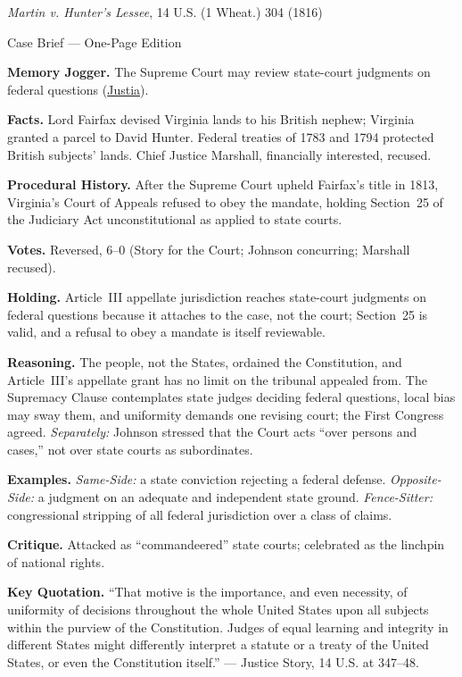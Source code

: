 \documentclass[12pt]{article}
\begin{document}
\begin{center}
{\Large \textit{Martin v. Hunter's Lessee}, 14 U.S. (1 Wheat.) 304 (1816)\par}
\vspace{0.3em}
{\normalsize Case Brief --- One-Page Edition\par}
\end{center}

\textbf{Memory Jogger.} The Supreme Court may review state-court judgments on federal questions (\href{https://supreme.justia.com/cases/federal/us/14/304/}{Justia}).

\textbf{Facts.} Lord Fairfax devised Virginia lands to his British nephew; Virginia granted a parcel to David Hunter. Federal treaties of 1783 and 1794 protected British subjects' lands. Chief Justice Marshall, financially interested, recused.

\textbf{Procedural History.} After the Supreme Court upheld Fairfax's title in 1813, Virginia's Court of Appeals refused to obey the mandate, holding Section~25 of the Judiciary Act unconstitutional as applied to state courts.

\textbf{Votes.} Reversed, 6--0 (Story for the Court; Johnson concurring; Marshall recused).

\textbf{Holding.} Article~III appellate jurisdiction reaches state-court judgments on federal questions because it attaches to the case, not the court; Section~25 is valid, and a refusal to obey a mandate is itself reviewable.

\textbf{Reasoning.} The people, not the States, ordained the Constitution, and Article~III's appellate grant has no limit on the tribunal appealed from. The Supremacy Clause contemplates state judges deciding federal questions, local bias may sway them, and uniformity demands one revising court; the First Congress agreed. \emph{Separately:} Johnson stressed that the Court acts ``over persons and cases,'' not over state courts as subordinates.

\textbf{Examples.} \emph{Same-Side:} a state conviction rejecting a federal defense. \emph{Opposite-Side:} a judgment on an adequate and independent state ground. \emph{Fence-Sitter:} congressional stripping of all federal jurisdiction over a class of claims.

\textbf{Critique.} Attacked as ``commandeered'' state courts; celebrated as the linchpin of national rights.

\textbf{Key Quotation.} ``That motive is the importance, and even necessity, of uniformity of decisions throughout the whole United States upon all subjects within the purview of the Constitution. Judges of equal learning and integrity in different States might differently interpret a statute or a treaty of the United States, or even the Constitution itself.'' --- Justice Story, 14 U.S. at 347--48.
\end{document}
